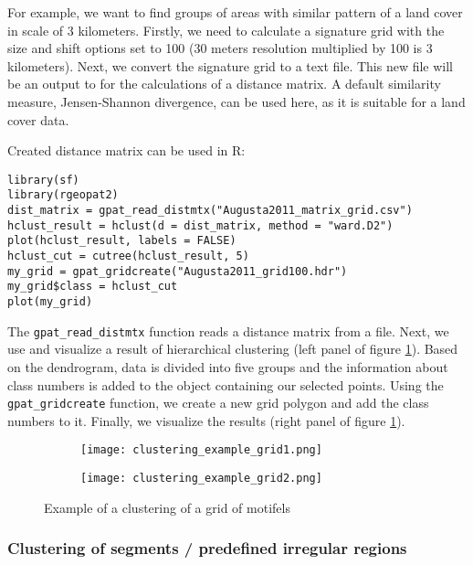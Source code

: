 For example, we want to find groups of areas with similar pattern of a land cover in scale of 3 kilometers.
Firstly, we need to calculate a signature grid with the size and shift options set to 100 (30 meters resolution multiplied by 100 is 3 kilometers).
Next, we convert the signature grid to a text file.
This new file will be an output to for the calculations of a distance matrix.
A default similarity measure, Jensen-Shannon divergence, can be used here, as it is suitable for a land cover data.

Created distance matrix can be used in R:

\begin{minipage}{\linewidth}
\begin{lstlisting}
library(sf)
library(rgeopat2)
dist_matrix = gpat_read_distmtx("Augusta2011_matrix_grid.csv")
hclust_result = hclust(d = dist_matrix, method = "ward.D2")
plot(hclust_result, labels = FALSE)
hclust_cut = cutree(hclust_result, 5)
my_grid = gpat_gridcreate("Augusta2011_grid100.hdr")
my_grid$class = hclust_cut
plot(my_grid)
\end{lstlisting}
\end{minipage}

The {\tt gpat\_read\_distmtx} function reads a distance matrix from a file. 
Next, we use and visualize a result of hierarchical clustering (left panel of figure \ref{FIG:CLUSTER_GRID2}).
Based on the dendrogram, data is divided into five groups and the information about class numbers is added to the object containing our selected points.
Using the {\tt gpat\_gridcreate} function, we create a new grid polygon and add the class numbers to it.
Finally, we visualize the results (right panel of figure \ref{FIG:CLUSTER_GRID2}).

\begin{figure}[H]
  \begin{subfigure}[b]{0.5\textwidth}
    \texttt{[image: clustering\_example\_grid1.png]}
  \end{subfigure}
  \begin{subfigure}[b]{0.5\textwidth}
    \texttt{[image: clustering\_example\_grid2.png]}
  \end{subfigure}
  \caption{Example of a clustering of a grid of motifels}
  \label{FIG:CLUSTER_GRID2}
\end{figure}

\FloatBarrier

\subsubsection{Clustering of segments / predefined irregular regions}


